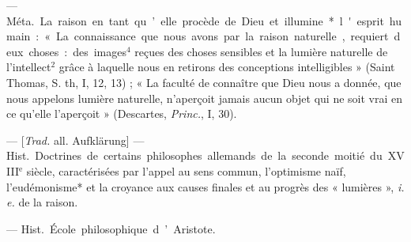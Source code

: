 \begin{itemize}[leftmargin=1cm, label=, itemsep=1pt]
 — \si{Méta.} La raison
en tant qu’elle procède de Dieu et
illumine* l'esprit humain : « La
connaissance que nous avons par la
raison naturelle, requiert deux
choses : des images$^4$ reçues des
choses sensibles et la lumière naturelle de l’intellect$^2$ grâce à laquelle
nous en retirons des conceptions
intelligibles » (Saint Thomas, S. th,
I, 12, 13) ; « La faculté de connaître
que Dieu nous a donnée, que nous
appelons lumière naturelle, n'aperçoit jamais aucun objet qui ne soit
vrai en ce qu’elle l'aperçoit » (Descartes, {\it Princ.}, I, 30).

 — [{\it Trad.}
all. Aufklärung] — \si{Hist.} Doctrines
de certains philosophes allemands de
la seconde moitié du {\footnotesize XVIII}$^\text{e}$ siècle,
caractérisées par l'appel au sens
commun, l'optimisme naïf, l’eudémonisme* et la croyance aux causes
finales et au progrès des « lumières »,
{\it i. e.} de la raison.

 — \si{Hist.} École philosophique
d’Aristote.

	\end{itemize}
